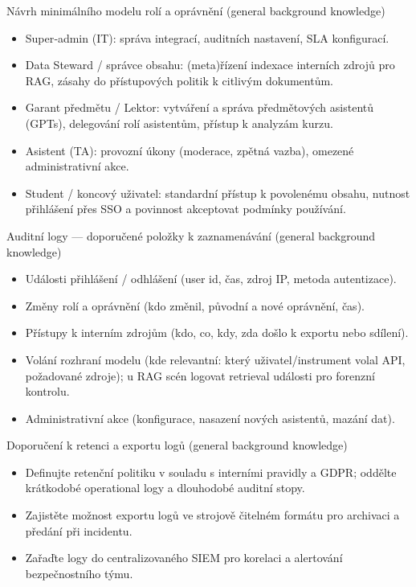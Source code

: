 \documentclass{report}%
\begin{document}
Návrh minimálního modelu rolí a oprávnění (general background knowledge)
\begin{itemize}
  \item Super‑admin (IT): správa integrací, auditních nastavení, SLA konfigurací.
  \item Data Steward / správce obsahu: (meta)řízení indexace interních zdrojů pro RAG, zásahy do přístupových politik k citlivým dokumentům.
  \item Garant předmětu / Lektor: vytváření a správa předmětových asistentů (GPTs), delegování rolí asistentům, přístup k analyzám kurzu.
  \item Asistent (TA): provozní úkony (moderace, zpětná vazba), omezené administrativní akce.
  \item Student / koncový uživatel: standardní přístup k povolenému obsahu, nutnost přihlášení přes SSO a povinnost akceptovat podmínky používání.
\end{itemize}

Auditní logy — doporučené položky k zaznamenávání (general background knowledge)
\begin{itemize}
  \item Události přihlášení / odhlášení (user id, čas, zdroj IP, metoda autentizace).
  \item Změny rolí a oprávnění (kdo změnil, původní a nové oprávnění, čas).
  \item Přístupy k interním zdrojům (kdo, co, kdy, zda došlo k exportu nebo sdílení).
  \item Volání rozhraní modelu (kde relevantní: který uživatel/instrument volal API, požadované zdroje); u RAG scén logovat retrieval události pro forenzní kontrolu.
  \item Administrativní akce (konfigurace, nasazení nových asistentů, mazání dat).
\end{itemize}

Doporučení k retenci a exportu logů (general background knowledge)
\begin{itemize}
  \item Definujte retenční politiku v souladu s interními pravidly a GDPR; oddělte krátkodobé operational logy a dlouhodobé auditní stopy.
  \item Zajistěte možnost exportu logů ve strojově čitelném formátu pro archivaci a předání při incidentu.
  \item Zařaďte logy do centralizovaného SIEM pro korelaci a alertování bezpečnostního týmu.
\end{itemize}
\end{document}
